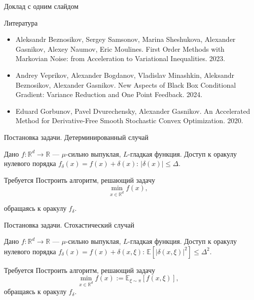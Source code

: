 \documentclass{beamer}
\begin{document}
\begin{frame}{Доклад с одним слайдом}
\end{frame}


\begin{frame}{Литература}

\begin{itemize}
 \item Aleksandr Beznosikov, Sergey Samsonov, Marina Sheshukova, Alexander Gasnikov, Alexey Naumov, Eric Moulines. First Order Methods with Markovian Noise: from Acceleration to Variational Inequalities. 2023.
 \item Andrey Veprikov, Alexander Bogdanov, Vladislav Minashkin, Aleksandr Beznosikov, Alexander Gasnikov. New Aspects of Black Box Conditional Gradient: Variance Reduction and One Point Feedback. 2024.
 \item Eduard Gorbunov, Pavel Dvurechensky, Alexander Gasnikov. An Accelerated Method for Derivative-Free Smooth Stochastic Convex Optimization. 2020.
\end{itemize}

\end{frame}


\begin{frame}{Постановка задачи. Детерминированный случай}
\begin{block}{Дано}
 $f: \mathbb{R}^d \to \mathbb{R}$ --- $\mu$-сильно выпуклая, $L$-гладкая функция. Доступ к оракулу нулевого порядка $f_\delta(x) = f(x) + \delta(x)$: $|\delta(x)| \leqslant \Delta$.
\end{block}
\begin{block}{Требуется}
 Построить алгоритм, решающий задачу
 \begin{equation}
  \min\limits_{x \in \mathbb{R}^d} f(x),
  \label{determenistic_problem}
 \end{equation}

 обращаясь к оракулу $f_\delta$.
\end{block}

\end{frame}


\begin{frame}{Постановка задачи. Стохастический случай}
\begin{block}{Дано}
 $f: \mathbb{R}^d \to \mathbb{R}$ --- $\mu$-сильно выпуклая, $L$-гладкая функция. Доступ к оракулу нулевого порядка $f_\delta(x) = f(x) + \delta(x, \xi)$: $\mathbb{E}[|\delta(x, \xi)|^2] \leqslant \Delta^2$.
\end{block}
\begin{block}{Требуется}
 Построить алгоритм, решающий задачу
 $$\min\limits_{x \in \mathbb{R}^d} f(x) := \mathbb{E}_{\xi \sim \pi}[f(x, \xi)],$$
 обращаясь к оракулу $f_\delta$.
\end{block}

\end{frame}
\end{document}
